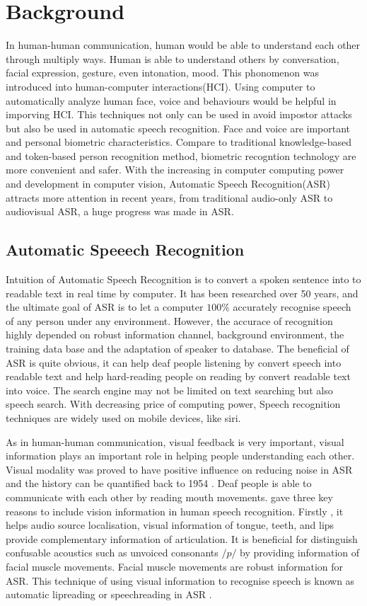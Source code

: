 \chapter{Background}
In human-human communication, human would be able to understand each other through multiply ways. Human is able to understand others by conversation, facial expression, gesture, even intonation, mood. This phonomenon was introduced into human-computer interactions(HCI). Using computer to automatically analyze human face, voice and behaviours would be helpful in imporving HCI. This techniques not only can be used in avoid impostor attacks but also be used in automatic speech recognition. Face and voice are important and personal biometric characteristics. Compare to traditional knowledge-based and token-based person recognition method, biometric recogntion technology are more convenient and safer. With the increasing in computer computing power and development in computer vision, Automatic Speech Recognition(ASR) attracts more attention in recent years, from traditional audio-only ASR to audiovisual ASR, a huge progress was made in ASR.

\section{Automatic Speeech Recognition}
Intuition of Automatic Speech Recognition is to convert a spoken sentence into to readable text in real time by computer. It has been researched over 50 years, and the ultimate goal of ASR is to let a computer $100\%$ accurately recognise speech of any person under any environment. However, the accurace of recognition highly depended on robust information channel, background environment, the training data base and the adaptation of speaker to database. The beneficial of ASR is quite obvious, it can help deaf people listening by convert speech into readable text and help hard-reading people on reading by convert readable text into voice. The search engine may not be limited on text searching but also speech search. With decreasing price of computing power, Speech recognition techniques are widely used on mobile devices, like siri.

As in human-human communication, visual feedback is very important, visual information plays an important role in helping people understanding each other. Visual modality was proved to have positive influence on reducing noise in ASR and the history can be quantified back to 1954 \cite{potamianos2003recent}. Deaf people is able to communicate with each other by reading mouth movements. \cite{potamianos2003recent} gave three key reasons to include vision information in human speech recognition. Firstly , it helps audio source localisation, visual information of tongue, teeth, and lips provide complementary information of articulation. It is beneficial for distinguish confusable acoustics such as unvoiced consonants $/p/$ by providing information of facial muscle movements. Facial muscle movements are robust information for ASR. This technique of using visual information to recognise speech is known as automatic lipreading or speechreading in ASR \cite{potamianos2003recent}.


